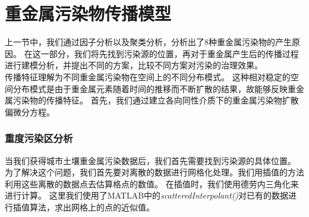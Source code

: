 \documentclass[a4paper]{article}
\begin{document}
\part{重金属污染物传播模型}
上一节中，我们通过因子分析以及聚类分析，分析出了8种重金属污染物的产生原因。
在这一部分，我们将先找到污染源的位置，再对于重金属产生后的传播过程进行建模分析，并提出不同的方案，比较不同方案对污染的治理效果。\\
\indent 传播特征理解为不同重金属污染物在空间上的不同分布模式。
这种相对稳定的空间分布模式是由于重金属元素随着时间的推移而不断扩散的结果，故能够反映重金属污染物的传播特征。
首先，我们通过建立各向同性介质下的重金属污染物扩散偏微分方程。
\section{重度污染区分析}
当我们获得城市土壤重金属污染数据后，我们首先需要找到污染源的具体位置。\\
\indent 为了解决这个问题，我们首先要对离散的数据进行网格化处理。我们用插值的方法利用这些离散的数据点去估算格点的数值。
在插值时，我们使用德劳内三角化来进行计算。
这里我们使用了MATLAB中的\emph{scatteredInterpolant()}对已有的数据进行插值算法，求出网格上的点的近似值。
\end{document}
